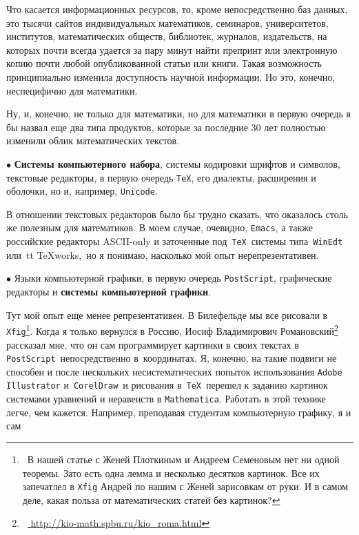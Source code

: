 \documentclass[intlimits,twoside,a4paper,11pt]{article}
\begin{document}
		Что касается информационных ресурсов, то, кроме непосредственно
		баз данных,  это тысячи сайтов индивидуальных математиков, 
		семинаров, университетов, институтов, математических обществ, библиотек, 
		журналов, издательств, на которых почти всегда удается за пару минут 
		найти препринт или электронную копию почти
		любой опубликованной статьи или книги. Такая возможность принципиально
		изменила доступность научной информации. Но это, конечно, неспецифично 
		для математики. 
		
		Ну, и, конечно, не только для математики, но для математики в первую очередь 
		я бы назвал еще два типа продуктов,
		которые за последние 30 лет полностью изменили облик математических текстов.
		\par\smallskip
		$\bullet$ {\bf Системы компьютерного набора}, системы кодировки шрифтов 
		и символов, текстовые редакторы, в первую очередь {\tt \TeX},  его диалекты, 
		расширения и оболочки, но и, например, {\tt Unicode}.
		\par
		В отношении текстовых редакторов
		было бы трудно сказать, что оказалось столь же полезным для математиков.
		В моем случае, очевидно, {\tt Emacs}, а также российские редакторы ASCII-only и заточенные
		под \,{\tt\TeX}\, системы типа \,{\tt WinEdt} \,или \,{tt {\TeX}works}, \,но  
		я понимаю, насколько мой опыт нерепрезентативен.
		\par\smallskip
		$\bullet$ Языки компьютерной графики, в первую очередь {\tt PostScript}, 
		графические редакторы и {\bf системы компьютерной графики}. 
		\par
		Тут мой опыт еще менее репрезентативен. В Билефельде мы все рисовали в
		\,{\tt Xfig}\footnote{~В нашей статье \cite{PSV} с Женей Плоткиным и Андреем
			Семеновым нет ни одной теоремы. Зато есть одна лемма и несколько десятков
			картинок. Все их запечатлел в {\tt Xfig} Андрей по нашим с Женей зарисовкам
			от руки. И в самом деле, какая польза от математических статей без картинок?}. 
		Когда я только
		вернулся в Россию, Иосиф Владимирович Романовский\footnote{~\url{
				http://kio-math.spbu.ru/kio\_roma.html}} рассказал мне, что он сам
		программирует картинки в своих текстах в \,{\tt PostScript}\, непосредственно
		в~координатах. Я, конечно, на такие подвиги не способен и после нескольких
		несистематических попыток использования  {\tt Adobe Illustrator} и 
		\,{\tt CorelDraw}\, и рисования в \,{\tt\TeX}\, перешел к заданию картинок
		системами уравнений и неравенств в {\tt Mathematica}. Работать 
		в этой технике легче, чем кажется. 
		Например, преподавая студентам компьютерную графику, я и сам
\end{document}
